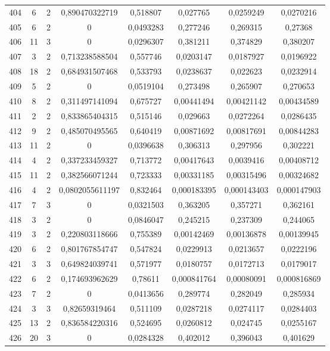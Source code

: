 \begin{longtable}{|c|c|c|c|c|c|c|c|}
404 & 6 & 2 & 0,890470322719 & 0,518807 & 0,027765 & 0,0259249 & 0,0270216  \\
405 & 6 & 2 & 0 & 0,0493283 & 0,277246 & 0,269315 & 0,27368  \\
406 & 11 & 3 & 0 & 0,0296307 & 0,381211 & 0,374829 & 0,380207  \\
407 & 3 & 2 & 0,713238588504 & 0,557746 & 0,0203147 & 0,0187927 & 0,0196922  \\
408 & 18 & 2 & 0,684931507468 & 0,533793 & 0,0238637 & 0,022623 & 0,0232914  \\
409 & 5 & 2 & 0 & 0,0519104 & 0,273498 & 0,265907 & 0,270653  \\
410 & 8 & 2 & 0,311497141094 & 0,675727 & 0,00441494 & 0,00421142 & 0,00434589  \\
411 & 2 & 2 & 0,833865404315 & 0,515146 & 0,029663 & 0,0272264 & 0,0286435  \\
412 & 9 & 2 & 0,485070495565 & 0,640419 & 0,00871692 & 0,00817691 & 0,00844283  \\
413 & 11 & 2 & 0 & 0,0396638 & 0,306313 & 0,297956 & 0,302221  \\
414 & 4 & 2 & 0,337233459327 & 0,713772 & 0,00417643 & 0,0039416 & 0,00408712  \\
415 & 11 & 2 & 0,382566071244 & 0,723333 & 0,00331185 & 0,00315496 & 0,00324682  \\
416 & 4 & 2 & 0,0802055611197 & 0,832464 & 0,000183395 & 0,000143403 & 0,000147903  \\
417 & 7 & 3 & 0 & 0,0321503 & 0,363205 & 0,357271 & 0,362161  \\
418 & 3 & 2 & 0 & 0,0846047 & 0,245215 & 0,237309 & 0,244065  \\
419 & 3 & 2 & 0,220803118666 & 0,755389 & 0,00142469 & 0,00136878 & 0,00139945  \\
420 & 6 & 2 & 0,801767854747 & 0,547824 & 0,0229913 & 0,0213657 & 0,0222196  \\
421 & 3 & 3 & 0,649824039741 & 0,571977 & 0,0180757 & 0,0172713 & 0,0179017  \\
422 & 6 & 2 & 0,174693962629 & 0,78611 & 0,000841764 & 0,00080091 & 0,000816869  \\
423 & 7 & 2 & 0 & 0,0413656 & 0,289774 & 0,282049 & 0,285934  \\
424 & 3 & 3 & 0,82659319464 & 0,511109 & 0,0287218 & 0,0274117 & 0,0284403  \\
425 & 13 & 2 & 0,836584220316 & 0,524695 & 0,0260812 & 0,024745 & 0,0255167  \\
426 & 20 & 3 & 0 & 0,0284328 & 0,402012 & 0,396043 & 0,401629  \\

\end{longtable}
